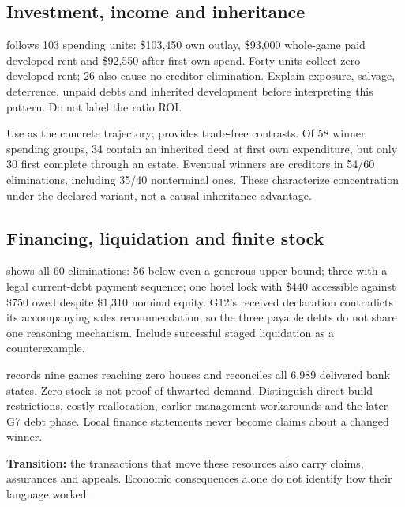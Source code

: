 \subsection{Investment, income and inheritance}
 follows 103 spending units: \$103,450 own outlay, \$93,000 whole-game paid developed rent and \$92,550 after first own spend. Forty units collect zero developed rent; 26 also cause no creditor elimination. Explain exposure, salvage, deterrence, unpaid debts and inherited development before interpreting this pattern. Do not label the ratio ROI.

Use  as the concrete trajectory;  provides trade-free contrasts. Of 58 winner spending groups, 34 contain an inherited deed at first own expenditure, but only 30 first complete through an estate. Eventual winners are creditors in 54/60 eliminations, including 35/40 nonterminal ones. These characterize concentration under the declared variant, not a causal inheritance advantage.

\subsection{Financing, liquidation and finite stock}
 shows all 60 eliminations: 56 below even a generous upper bound; three with a legal current-debt payment sequence; one hotel lock with \$440 accessible against \$750 owed despite \$1,310 nominal equity. G12's received declaration contradicts its accompanying sales recommendation, so the three payable debts do not share one reasoning mechanism. Include successful staged liquidation as a counterexample.

 records nine games reaching zero houses and reconciles all 6,989 delivered bank states. Zero stock is not proof of thwarted demand. Distinguish direct build restrictions, costly reallocation, earlier management workarounds and the later G7 debt phase. Local finance statements never become claims about a changed winner.

\textbf{Transition:} the transactions that move these resources also carry claims, assurances and appeals. Economic consequences alone do not identify how their language worked.

